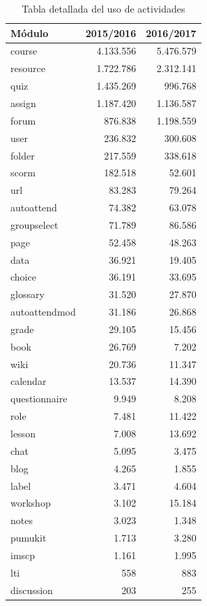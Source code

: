 \begin{table}[H]
\centering
\begin{tabular}{|l|r|r|}
\hline
\textbf{Módulo} & \textbf{2015/2016} & \textbf{2016/2017} \\ \hline
course        & 4.133.556 & 5.476.579 \\
resource      & 1.722.786 & 2.312.141 \\
quiz          & 1.435.269 & 996.768   \\
assign        & 1.187.420 & 1.136.587 \\
forum         & 876.838   & 1.198.559 \\
user          & 236.832   & 300.608   \\
folder        & 217.559   & 338.618   \\
scorm         & 182.518   & 52.601    \\
url           & 83.283    & 79.264    \\
autoattend    & 74.382    & 63.078    \\
groupselect   & 71.789    & 86.586    \\
page          & 52.458    & 48.263    \\
data          & 36.921    & 19.405    \\
choice        & 36.191    & 33.695    \\
glossary      & 31.520    & 27.870    \\
autoattendmod & 31.186    & 26.868    \\
grade         & 29.105    & 15.456    \\
book          & 26.769    & 7.202     \\
wiki          & 20.736    & 11.347    \\
calendar      & 13.537    & 14.390    \\
questionnaire & 9.949     & 8.208     \\
role          & 7.481     & 11.422    \\
lesson        & 7.008     & 13.692    \\
chat          & 5.095     & 3.475     \\
blog          & 4.265     & 1.855     \\
label         & 3.471     & 4.604     \\
workshop      & 3.102     & 15.184    \\
notes         & 3.023     & 1.348     \\
pumukit       & 1.713     & 3.280     \\
imscp         & 1.161     & 1.995     \\
lti           & 558       & 883       \\
discussion    & 203       & 255      
\end{tabular}
\caption{Tabla detallada del uso de actividades}
\label{table:usoactividades_2015}
\end{table}


